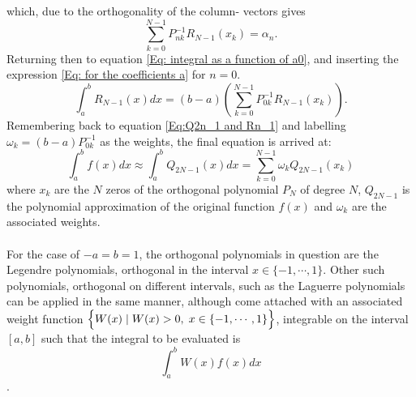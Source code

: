 \documentclass[10pt,a4paper]{article}
\begin{document}
which, due to the orthogonality of the column- vectors gives
\begin{equation}\label{Eq: for the coefficients a}
\sum\limits_{k=0}^{N-1}P_{nk}^{-1}R_{N-1}(x_k) = \alpha_n.
\end{equation}
Returning then to equation \ref{Eq: integral as a function of a0}, and inserting the expression \ref{Eq: for the coefficients a} for $n=0$.
\begin{equation}
\int_{a}^bR_{N-1}(x)dx = (b-a)\left( \sum\limits_{k=0}^{N-1}P_{0k}^{-1} R_{N-1}(x_k)\right).
\end{equation}
Remembering back to equation \ref{Eq:Q2n_1 and Rn_1} and labelling $\omega_k =(b-a)P_{0k}^{-1}$ as the weights, the final equation is arrived at:
\begin{equation}
\int_{a}^bf(x)dx \approx \int_{a}^bQ_{2N-1}(x)dx=\sum\limits_{k=0}^{N-1}\omega_k Q_{2N-1}(x_k)
\end{equation}
where $x_k$ are the $N$ zeros of the orthogonal polynomial $P_N$ of degree $N$, $Q_{2N-1}$ is the polynomial approximation of the original function $f(x)$ and $\omega_k$ are the associated weights.\\\\For the case of $-a=b=1$, the orthogonal polynomials in question are the Legendre polynomials, orthogonal in the interval $x\in \{-1,\cdots,1\}$. Other such polynomials, orthogonal on different intervals, such as the Laguerre polynomials can be applied in the same manner, although come attached with an associated weight function $\Big \{W(x)\hspace{1mm}|\hspace{1mm} W(x)>0,\hspace{1mm}x \in \{-1,\cdots,1\}\Big \}$, integrable on the interval $[a,b]$ such that the integral to be evaluated is 
$$
\int_a^b W(x)f(x)dx
$$\cite{Lecture_Notes_Fall_2015}.
\end{document}
